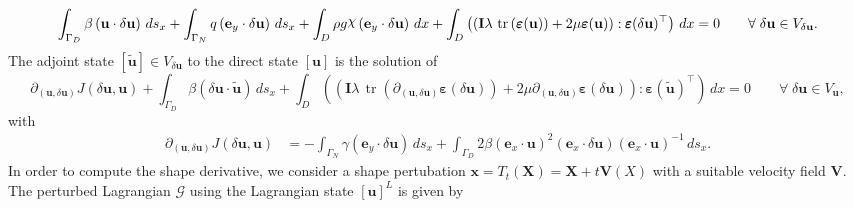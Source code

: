 \documentclass[preview]{standalone}
\let\oldcdot\cdot
\let\cdot\oldcdot
\begin{document}
\begin{dmath*}
 \int_{\Gamma_D} \beta \left( {\mathbf{ u }} \cdot {\delta\mathbf{  u }} \right) \,ds_x +  \int_{\Gamma_N} q \left( \mathbf e_y \cdot {\delta\mathbf{  u }} \right) \,ds_x +  \int_{D} \rho g \raisebox{\depth}{$\chi$} \left( \mathbf e_y \cdot {\delta\mathbf{  u }} \right) \,dx +  \int_{D} \left( \left( \mathbf{I} \lambda  \,\operatorname{tr}\left(\bm\varepsilon({\mathbf{ u }})\right)  + 2 \mu \bm\varepsilon({\mathbf{ u }}) \right) \mathrel{:}  \pmb\varepsilon({\delta\mathbf{  u }})^\top  \right) \,dx = 0\qquad \forall\; {{\delta\mathbf{  u }}\in V_{{\delta\mathbf{  u }}}} . 
\end{dmath*}
The adjoint state $\left[ \tilde{\mathbf{ u }}\right] \in  V_{{\delta\mathbf{  u }}}$ to the direct state $\left[ {\mathbf{ u }}\right]$ is the solution of
\begin{dmath*}
\partial_{({\mathbf{ u }},{\delta\mathbf{  u }})} J({\delta\mathbf{  u }},{\mathbf{ u }}) +  \int_{\Gamma_D} \beta \left( {\delta\mathbf{  u }} \cdot \tilde{\mathbf{ u }} \right) \,ds_x +  \int_{D} \left( \left( \mathbf{I} \lambda  \,\operatorname{tr}\left(\partial_{({\mathbf{ u }},{\delta\mathbf{  u }})} \bm\varepsilon({\delta\mathbf{  u }})\right)  + 2 \mu \partial_{({\mathbf{ u }},{\delta\mathbf{  u }})} \bm\varepsilon({\delta\mathbf{  u }}) \right) \mathrel{:}  \pmb\varepsilon(\tilde{\mathbf{ u }})^\top  \right) \,dx = 0\qquad \forall\; {{\delta\mathbf{  u }}\in V_{{\mathbf{ u }}}} , 
\end{dmath*}
with 
\begin{align*}
\partial_{({\mathbf{ u }},{\delta\mathbf{  u }})} J({\delta\mathbf{  u }},{\mathbf{ u }}) &= -  \int_{\Gamma_N} \gamma \left( \mathbf e_y \cdot {\delta\mathbf{  u }} \right) \,ds_x +  \int_{\Gamma_D} 2 \beta \left( \mathbf e_x \cdot {\mathbf{ u }} \right)^{2} \left( \mathbf e_x \cdot {\delta\mathbf{  u }} \right) \left( \mathbf e_x \cdot {\mathbf{ u }} \right)^{-1} \,ds_x.
 \end{align*}
In order to compute the shape derivative, we consider a shape pertubation $\mathbf x = T_t(\mathbf X) = \mathbf X + t \mathbf  V(X)$ with a suitable velocity field $\mathbf V$. The perturbed Lagrangian $\mathcal G$ using the Lagrangian state $\left[ {\mathbf{ u }}\right]^{L}$ is given by
\end{document}
